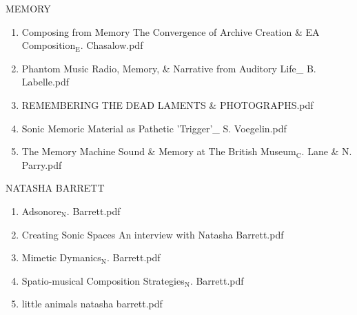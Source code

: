 \documentclass[11pt]{article}
\begin{document}
\item MEMORY
\label{sec-1-1-1-1-49-1-23}
\begin{enumerate}
\item Composing from Memory The Convergence of Archive Creation \& EA Composition$_{\text{E}}$. Chasalow.pdf
\label{sec-1-1-1-1-49-1-23-1}

\item Phantom Music Radio, Memory, \& Narrative from Auditory Life\_ B. Labelle.pdf
\label{sec-1-1-1-1-49-1-23-2}

\item REMEMBERING THE DEAD LAMENTS \& PHOTOGRAPHS.pdf
\label{sec-1-1-1-1-49-1-23-3}

\item Sonic Memoric Material as Pathetic 'Trigger'\_ S. Voegelin.pdf
\label{sec-1-1-1-1-49-1-23-4}

\item The Memory Machine Sound \& Memory at The British Museum$_{\text{C}}$. Lane \& N. Parry.pdf
\label{sec-1-1-1-1-49-1-23-5}
\end{enumerate}

\item NATASHA BARRETT
\label{sec-1-1-1-1-49-1-24}
\begin{enumerate}
\item Adsonore$_{\text{N}}$. Barrett.pdf
\label{sec-1-1-1-1-49-1-24-1}

\item Creating Sonic Spaces An interview with Natasha Barrett.pdf
\label{sec-1-1-1-1-49-1-24-2}

\item Mimetic Dymanics$_{\text{N}}$. Barrett.pdf
\label{sec-1-1-1-1-49-1-24-3}

\item Spatio-musical Composition Strategies$_{\text{N}}$. Barrett.pdf
\label{sec-1-1-1-1-49-1-24-4}

\item little animals natasha barrett.pdf
\label{sec-1-1-1-1-49-1-24-5}
\end{enumerate}
\end{document}
